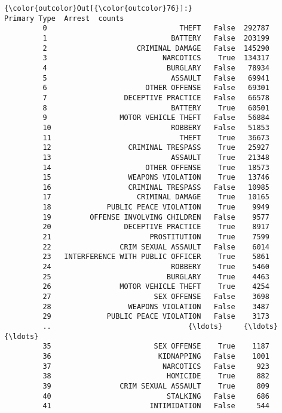 \documentclass[11pt]{article}
\begin{document}
\begin{Verbatim}[commandchars=\\\{\}]
{\color{outcolor}Out[{\color{outcolor}76}]:}                          Primary Type  Arrest  counts
         0                               THEFT   False  292787
         1                             BATTERY   False  203199
         2                     CRIMINAL DAMAGE   False  145290
         3                           NARCOTICS    True  134317
         4                            BURGLARY   False   78934
         5                             ASSAULT   False   69941
         6                       OTHER OFFENSE   False   69301
         7                  DECEPTIVE PRACTICE   False   66578
         8                             BATTERY    True   60501
         9                 MOTOR VEHICLE THEFT   False   56884
         10                            ROBBERY   False   51853
         11                              THEFT    True   36673
         12                  CRIMINAL TRESPASS    True   25927
         13                            ASSAULT    True   21348
         14                      OTHER OFFENSE    True   18573
         15                  WEAPONS VIOLATION    True   13746
         16                  CRIMINAL TRESPASS   False   10985
         17                    CRIMINAL DAMAGE    True   10165
         18             PUBLIC PEACE VIOLATION    True    9949
         19         OFFENSE INVOLVING CHILDREN   False    9577
         20                 DECEPTIVE PRACTICE    True    8917
         21                       PROSTITUTION    True    7599
         22                CRIM SEXUAL ASSAULT   False    6014
         23   INTERFERENCE WITH PUBLIC OFFICER    True    5861
         24                            ROBBERY    True    5460
         25                           BURGLARY    True    4463
         26                MOTOR VEHICLE THEFT    True    4254
         27                        SEX OFFENSE   False    3698
         28                  WEAPONS VIOLATION   False    3487
         29             PUBLIC PEACE VIOLATION   False    3173
         ..                                {\ldots}     {\ldots}     {\ldots}
         35                        SEX OFFENSE    True    1187
         36                         KIDNAPPING   False    1001
         37                          NARCOTICS   False     923
         38                           HOMICIDE    True     882
         39                CRIM SEXUAL ASSAULT    True     809
         40                           STALKING   False     686
         41                       INTIMIDATION   False     544

\end{Verbatim}
\end{document}
